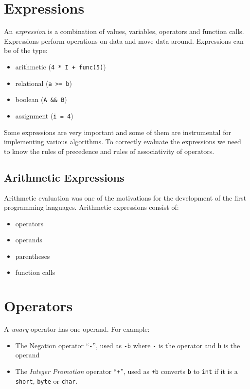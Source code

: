 
\section{Expressions}
An \textit{expression} is a combination of values, variables, operators and function calls. Expressions perform operations on data and move data around. Expressions can be of the type:
\begin{itemize}
    \item arithmetic (\verb|4 * I + func(5)|)
    \item relational (\verb|a >= b|)
    \item boolean (\verb|A && B|)
    \item assignment (\verb|i = 4|)
\end{itemize}

Some expressions are very important and some of them are instrumental for implementing various algorithms. To correctly evaluate the expressions we need to know the rules of precedence and rules of associativity of operators.

\subsection{Arithmetic Expressions}
Arithmetic evaluation was one of the motivations for the development of the first programming languages. Arithmetic expressions consist of:
\begin{itemize}
    \item operators
    \item operands
    \item parentheses
    \item function calls
\end{itemize}

\section{Operators}
A \textit{unary} operator has one operand. For example:
\begin{itemize}
    \item The Negation operator ``\verb|-|'', used as \verb|-b| where \verb|-| is the operator and \verb|b| is the operand
    \item The \textit{Integer Promotion} operator ``\verb|+|'', used as \verb|+b| converts \verb|b| to \verb|int| if it is a \verb|short|, \verb|byte| or \verb|char|. 
\end{itemize}

